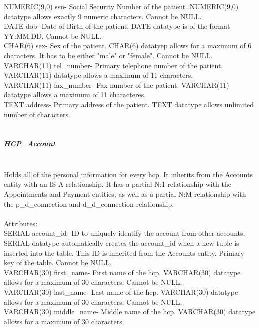 \documentclass[12pt]{report}
\begin{document}
NUMERIC(9,0) ssn- Social Security Number of the patient. NUMERIC(9,0) datatype allows exactly 9 numeric characters.  Cannot be NULL.\\

DATE dob- Date of Birth of the patient.  DATE datatype is of the format YY:MM:DD.  Cannot be NULL.\\

CHAR(6) sex- Sex of the patient. CHAR(6) datatyep allows for a maximum of 6 characters.  It has to be either "male" or "female".  Cannot be NULL.\\

VARCHAR(11) tel_number- Primary telephone number of the patient.  VARCHAR(11) datatype allows a maximum of 11 characters.\\

VARCHAR(11) fax_number- Fax number of the patient.  VARCHAR(11) datatype allows a maximum of 11 characteres.\\

TEXT address- Primary address of the patient.  TEXT datatype allows unlimited number of characters.\\ \\

\subparagraph{HCP_Account}\\
Holds all of the personal information for every hcp.  It inherits from the Accounts entity with an IS A relationship.  It has a partial N:1 relationship with the Appointments and Payment entities, as well as a partial N:M relationship with the p_d_connection and d_d_connection relationship.\\ \\

Attributes:\\
SERIAL account_id- ID to uniquely identify the account from other accounts. SERIAL datatype automatically creates the account_id when a new tuple is inserted into the table.  This ID is inherited from the Accounts entity. Primary key of the table.  Cannot be NULL.\\

VARCHAR(30) first_name-  First name of the hcp.  VARCHAR(30) datatype allows for a maximum of 30 characters.  Cannot be NULL.\\

VARCHAR(30) last_name- Last name of the hcp.  VARCHAR(30) datatype allows for a maximum of 30 characters.  Cannot be NULL.\\ 

VARCHAR(30) middle_name- Middle name of the hcp. VARCHAR(30) datatype allows for a maximum of 30 characters.\\
\end{document}
